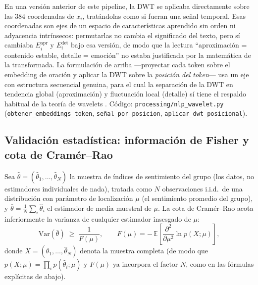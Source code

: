 \documentclass[11pt,a4paper,oneside]{article}
\theoremstyle{definition}
\begin{document}
\begin{implBox}[title=Corrección de diseño]
En una versión anterior de este pipeline, la DWT se aplicaba directamente sobre las $384$
coordenadas de $x_i$, tratándolas como si fueran una señal temporal. Esas coordenadas son ejes
de un espacio de características aprendido sin orden ni adyacencia intrínsecos: permutarlas no
cambia el significado del texto, pero sí cambiaba $E^{\mathrm{apr}}_i$ y $E^{\mathrm{det}}_i$
bajo esa versión, de modo que la lectura ``aproximación = contenido estable, detalle = emoción''
no estaba justificada por la matemática de la transformada. La formulación de arriba —proyectar
cada token sobre el embedding de oración y aplicar la DWT sobre la \emph{posición del token}—
usa un eje con estructura secuencial genuina, para el cual la separación de la DWT en
tendencia global (aproximación) y fluctuación local (detalle) sí tiene el respaldo habitual de
la teoría de wavelets \cite{Mallat1989}. Código: \texttt{processing/nlp\_wavelet.py}
(\texttt{obtener\_embeddings\_token}, \texttt{señal\_por\_posicion},
\texttt{aplicar\_dwt\_posicional}).
\end{implBox}

\subsection{Validación estadística: información de Fisher y cota de Cramér--Rao}
\label{sec:crb}

Sea $\hat\theta = (\hat\theta_1,\ldots,\hat\theta_N)$ la muestra de índices de sentimiento del
grupo (los datos, no estimadores individuales de nada), tratada como $N$ observaciones
i.i.d.\ de una distribución con parámetro de localización $\mu$ (el sentimiento promedio del
grupo), y $\bar\theta = \frac1N\sum_i \hat\theta_i$ el estimador de media muestral de $\mu$. La
cota de Cramér--Rao \cite{Fisher1922,Rao1945,Cramer1946} acota inferiormente la varianza de
cualquier estimador insesgado de $\mu$:
\[
\mathrm{Var}(\bar\theta) \;\ge\; \frac{1}{F(\mu)},
\qquad
F(\mu) = -\,\mathbb{E}\!\left[\frac{\partial^2}{\partial\mu^2}\ln p(X;\mu)\right],
\]
donde $X=(\hat\theta_1,\ldots,\hat\theta_N)$ denota la muestra completa (de modo que
$p(X;\mu)=\prod_i p(\hat\theta_i;\mu)$ y $F(\mu)$ ya incorpora el factor $N$, como en las
fórmulas explícitas de abajo).
\end{document}
